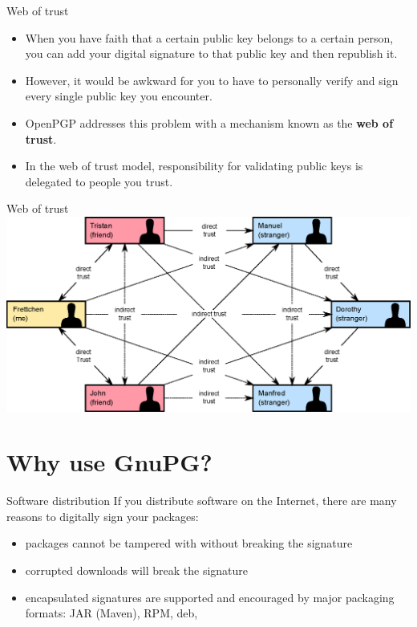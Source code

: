 \documentclass[%
mode=present,%
paper=smartboard,
size=20pt,
]{powerdot}
\begin{document}
\begin{slide}{Web of trust}
  \begin{itemize}
  \item When you have faith that a certain public key belongs to a
    certain person, you can add your digital signature to that public
    key and then republish it.
  \item However, it would be awkward for you to have to personally
    verify and sign every single public key you encounter.
  \item OpenPGP addresses this problem with a mechanism
    known as the \textbf{web of trust}.
  \item In the web of trust model, responsibility for validating
    public keys is delegated to people you trust.
  \end{itemize}
\end{slide}

\begin{slide}[toc=]{Web of trust}
\centering\includegraphics[width=\linewidth]{images/Web_of_Trust.eps}
\end{slide}


\section{Why use GnuPG?}
\begin{slide}{Software distribution}
  If you distribute software on the Internet, there are many reasons
  to digitally sign your packages:\\[1ex]
  \begin{itemize}
  \item packages cannot be tampered with without breaking the signature
  \item corrupted downloads will break the signature
  \item encapsulated signatures are supported and encouraged by major packaging formats: JAR (Maven), RPM, deb, \etc
  \end{itemize}
\end{slide}
\end{document}
